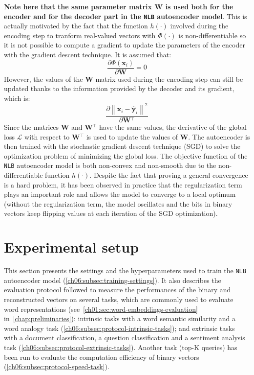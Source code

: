     \medskip
    \textbf{Note here that the same parameter matrix $\mathbf{W}$ is used both
    for the encoder and for the decoder part in the \texttt{NLB} autoencoder
    model}. This is actually motivated by the fact that the function $h(\cdot)$
    involved during the encoding step to tranform real-valued vectors with
    $\Phi(\cdot)$ is non-differentiable so it is not possible to compute a
    gradient to update the parameters of the encoder with the gradient descent
    technique. It is assumed that:
    \begin{equation}
      \frac{\partial \Phi(\mathbf{x}_i)}{\partial \mathbf{W}} = 0
    \end{equation}
    However, the values of the $\mathbf{W}$ matrix used during the encoding step
    can still be updated thanks to the information provided by the decoder and
    its gradient, which is:
    \begin{equation}
      \frac
        {\partial \left\lVert \mathbf{x}_i - \hat{\mathbf{y}}_i \right\rVert^2}
        {\partial \mathbf{W}{}^\top}
    \end{equation}
    Since the matrices $\mathbf{W}$ and $\mathbf{W}{}^\top$ have the same values,
    the derivative of the global loss $\mathcal{L}$ with respect to
    $\mathbf{W}{}^\top$ is used to update the values of $\mathbf{W}$. The
    autoencoder is then trained with the stochastic gradient descent technique
    (SGD) to solve the optimization problem of minimizing the global loss.  The
    objective function of the \texttt{NLB} autoencoder model is both non-convex
    and non-smooth due to the non-differentiable function $h(\cdot)$. Despite
    the fact that proving a general convergence is a hard problem, it has been
    observed in practice that the regularization term plays an important role
    and allows the model to converge to a local optimum (without the
    regularization term, the model oscillates and the bits in  binary vectors
    keep flipping values at each iteration of the SGD optimization).

\section{Experimental setup}
  \label{ch06:sec:experiments}
  This section presents the settings and the hyperparameters used to train the
  \texttt{NLB} autoencoder model (\autoref{ch06:subsec:training-settings}). It
  also describes the evaluation protocol followed to measure the performances of
  the binary and reconstructed vectors on several tasks, which are commonly used
  to evaluate word representations
  (see~\autoref{ch01:sec:word-embeddings-evaluation}
  in~\autoref{chap:preliminaries}): intrinsic tasks with a word semantic
  similarity and a word analogy task
  (\autoref{ch06:subsec:protocol-intrinsic-tasks}); and extrinsic tasks with a
  document classification, a question classification and a sentiment analysis
  task (\autoref{ch06:subsec:protocol-extrinsic-tasks}). Another task (top-K
  queries) has been run to evaluate the computation efficiency of binary vectors
  (\autoref{ch06:subsec:protocol-speed-task}).

